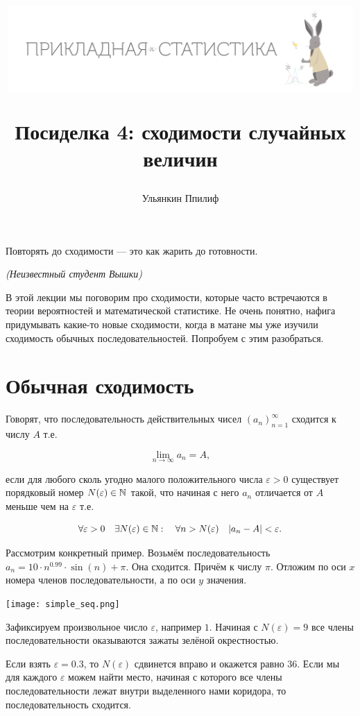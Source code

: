 \documentclass[12pt, a4paper, oneside]{article}
\title{
\begin{center} 
\includegraphics[width=0.99\textwidth]{logo.png}
\end{center}

Посиделка 4: сходимости случайных величин}
\date{ } %
\author{Ульянкин Ппилиф}
\begin{document}

\maketitle

\epigraph{Повторять до сходимости --- это как жарить до готовности.}{\textit{(Неизвестный студент Вышки)}}

В этой лекции мы поговорим про сходимости, которые часто встречаются в теории вероятностей и математической статистике. Не очень понятно, нафига придумывать какие-то новые сходимости, когда в матане мы уже изучили сходимость обычных последовательностей. Попробуем с этим разобраться. 


\section{Обычная сходимость}

Говорят, что последовательность действительных чисел $(a_n)_{n=1}^{\infty}$ сходится к числу $A$ т.е.

\[ 
\lim_{n \to \infty} a_n = A,
\]

если для любого сколь угодно малого положительного числа $\varepsilon > 0$ существует порядковый номер $N(\varepsilon) \in \mathbb N$ такой, что начиная с него $a_n$ отличается от $A$ меньше чем на $\varepsilon$ т.е. 

\[
\forall \varepsilon > 0 \quad  \exists N(\varepsilon) \in \mathbb N : \quad  \forall n > N(\varepsilon) \quad |a_n - A| < \varepsilon.
\]

Рассмотрим конкретный пример. Возьмём последовательность $a_n = 10 \cdot n^{0.99} \cdot \sin(n) + \pi.$ Она сходится. Причём к числу $\pi$. Отложим по оси $x$ номера членов последовательности, а по оси $y$ значения. 

\begin{center} 
\texttt{[image: simple\_seq.png]}
\end{center} 

Зафиксируем произвольное число $\varepsilon$, например $1$. Начиная с $N(\varepsilon) = 9$ все члены последовательности оказываются зажаты зелёной окрестностью. 

Если взять $\varepsilon = 0.3$, то $N(\varepsilon)$ сдвинется вправо и окажется равно $36$. Если мы для каждого $\varepsilon$ можем найти место, начиная с которого все члены последовательности лежат внутри выделенного нами коридора, то последовательность сходится.
\end{document}

